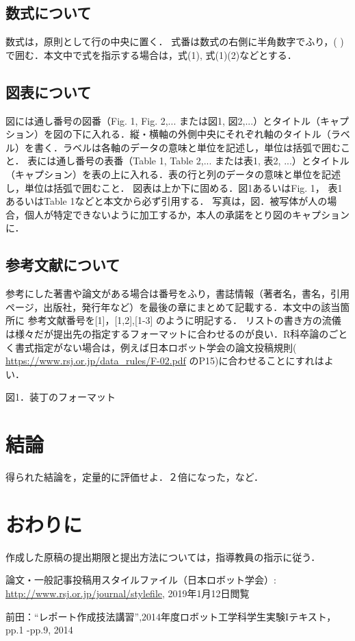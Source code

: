 \documentclass[10pt,twocolumn]{jsarticle}
\begin{document}
\subsection{数式について}
数式は，原則として行の中央に置く． 式番は数式の右側に半角数字でふり，( ) で囲む．本文中で式を指示する場合は，式(1), 式(1)(2)などとする． 
\subsection{図表について}
図には通し番号の図番（Fig. 1, Fig. 2,... または図1, 図2,...）とタイトル（キャプション）を図の下に入れる．縦・横軸の外側中央にそれぞれ軸のタイトル（ラベル）を書く．ラベルは各軸のデータの意味と単位を記述し，単位は括弧で囲むこと．
表には通し番号の表番（Table 1, Table 2,... または表1, 表2, ...）とタイトル（キャプション）を表の上に入れる．表の行と列のデータの意味と単位を記述し，単位は括弧で囲むこと．
図表は上か下に固める．図1あるいはFig. 1， 表1あるいはTable 1などと本文から必ず引用する．
写真は，図．被写体が人の場合，個人が特定できないように加工するか，本人の承諾をとり図のキャプションに．
\subsection{参考文献について}
参考にした著書や論文がある場合は番号をふり，書誌情報（著者名，書名，引用ページ，出版社，発行年など）を最後の章にまとめて記載する．本文中の該当箇所に 参考文献番号を[1]，[1,2],[1-3] のように明記する．
リストの書き方の流儀は様々だが提出先の指定するフォーマットに合わせるのが良い．R科卒論のごとく書式指定がない場合は，例えば日本ロボット学会の論文投稿規則( 
\url{https://www.rsj.or.jp/data_rules/F-02.pdf} のP15)に合わせることにすれはよい．
 
図1．装丁のフォーマット

\section{結論}
得られた結論を，定量的に評価せよ．２倍になった，など． 

\section{おわりに}
作成した原稿の提出期限と提出方法については，指導教員の指示に従う． 

\begin{thebibliography}{}
\bibitem
論文・一般記事投稿用スタイルファイル（日本ロボット学会）: \url{http://www.rsj.or.jp/journal/stylefile}, 2019年1月12日閲覧

\bibitem
前田：“レポート作成技法講習”,2014年度ロボット工学科学生実験Iテキスト，pp.1 -pp.9, 2014
\end{thebibliography}
\end{document}
